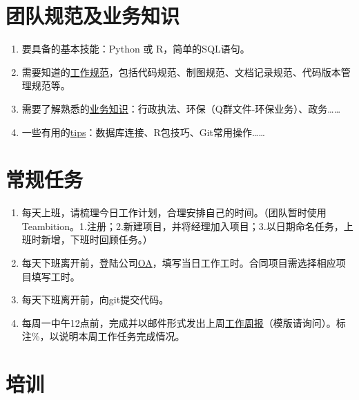 \documentclass[]{book}
\begin{document}
\hypertarget{section-1}{%
\chapter{团队规范及业务知识}\label{section-1}}

\begin{enumerate}
\def\labelenumi{\arabic{enumi}.}
\item
  要具备的基本技能：Python 或 R，简单的SQL语句。
\item
  需要知道的\href{http://git.minstone.com.cn/dataanalysisteam/minstone_data_analyze_team/work_standard}{工作规范}，包括代码规范、制图规范、文档记录规范、代码版本管理规范等。
\item
  需要了解熟悉的\href{}{业务知识}：行政执法、环保（Q群文件-环保业务）、政务\ldots{}\ldots{}
\item
  一些有用的\href{http://git.minstone.com.cn/dataanalysisteam/minstone_data_analyze_team/QuickStart}{tips}：数据库连接、R包技巧、Git常用操作\ldots{}\ldots{}
\end{enumerate}

\hypertarget{section-2}{%
\chapter{常规任务}\label{section-2}}

\begin{enumerate}
\def\labelenumi{\arabic{enumi}.}
\item
  每天上班，请梳理今日工作计划，合理安排自己的时间。（团队暂时使用Teambition。1.注册；2.新建项目，并将经理加入项目；3.以日期命名任务，上班时新增，下班时回顾任务。）
\item
  每天下班离开前，登陆公司\href{http://192.168.0.212/instance-web/minstone/login}{OA}，填写当日工作工时。合同项目需选择相应项目填写工时。
\item
  每天下班离开前，向git提交代码。
\item
  每周一中午12点前，完成并以邮件形式发出上周\href{http://git.minstone.com.cn/dataanalysisteam/minstone_data_analyze_team/work_standard/blob/master/WeeklyGuide_V1.0.md}{工作周报}（模版请询问）。标注\%，以说明本周工作任务完成情况。
\end{enumerate}

\hypertarget{section-3}{%
\chapter{培训}\label{section-3}}
\end{document}
